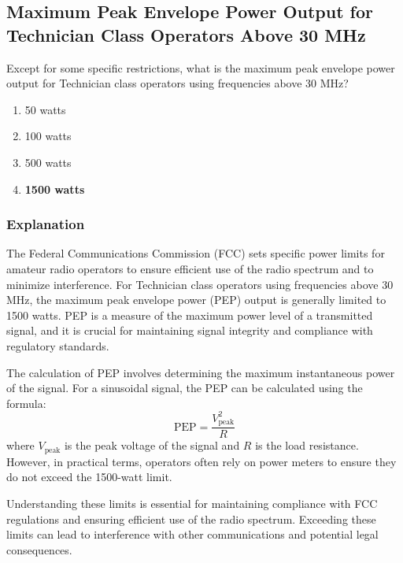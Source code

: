 \subsection{Maximum Peak Envelope Power Output for Technician Class Operators Above 30 MHz}
\label{T1B12}

\begin{tcolorbox}[colback=gray!10!white,colframe=black!75!black,title=T1B12]
Except for some specific restrictions, what is the maximum peak envelope power output for Technician class operators using frequencies above 30 MHz?
\begin{enumerate}[label=\Alph*]
    \item 50 watts
    \item 100 watts
    \item 500 watts
    \item \textbf{1500 watts}
\end{enumerate}
\end{tcolorbox}

\subsubsection{Explanation}
The Federal Communications Commission (FCC) sets specific power limits for amateur radio operators to ensure efficient use of the radio spectrum and to minimize interference. For Technician class operators using frequencies above 30 MHz, the maximum peak envelope power (PEP) output is generally limited to 1500 watts. PEP is a measure of the maximum power level of a transmitted signal, and it is crucial for maintaining signal integrity and compliance with regulatory standards.

The calculation of PEP involves determining the maximum instantaneous power of the signal. For a sinusoidal signal, the PEP can be calculated using the formula:
\[
\text{PEP} = \frac{V_{\text{peak}}^2}{R}
\]
where \( V_{\text{peak}} \) is the peak voltage of the signal and \( R \) is the load resistance. However, in practical terms, operators often rely on power meters to ensure they do not exceed the 1500-watt limit.

Understanding these limits is essential for maintaining compliance with FCC regulations and ensuring efficient use of the radio spectrum. Exceeding these limits can lead to interference with other communications and potential legal consequences.

